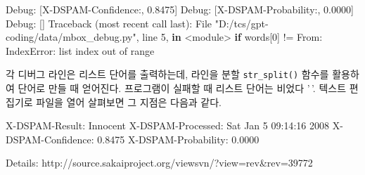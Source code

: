 \documentclass[
  letterpaper,
]{book}
\newenvironment{Shaded}{\begin{snugshade}}{\end{snugshade}}
\newcommand{\BuiltInTok}[1]{\textcolor[rgb]{0.00,0.23,0.31}{#1}}
\newcommand{\ControlFlowTok}[1]{\textcolor[rgb]{0.00,0.23,0.31}{\textbf{#1}}}
\newcommand{\DecValTok}[1]{\textcolor[rgb]{0.68,0.00,0.00}{#1}}
\newcommand{\ErrorTok}[1]{\textcolor[rgb]{0.68,0.00,0.00}{#1}}
\newcommand{\FloatTok}[1]{\textcolor[rgb]{0.68,0.00,0.00}{#1}}
\newcommand{\KeywordTok}[1]{\textcolor[rgb]{0.00,0.23,0.31}{\textbf{#1}}}
\newcommand{\NormalTok}[1]{\textcolor[rgb]{0.00,0.23,0.31}{#1}}
\newcommand{\OperatorTok}[1]{\textcolor[rgb]{0.37,0.37,0.37}{#1}}
\newcommand{\OtherTok}[1]{\textcolor[rgb]{0.00,0.23,0.31}{#1}}
\newcommand{\PreprocessorTok}[1]{\textcolor[rgb]{0.68,0.00,0.00}{#1}}
\newcommand{\SpecialCharTok}[1]{\textcolor[rgb]{0.37,0.37,0.37}{#1}}
\newcommand{\StringTok}[1]{\textcolor[rgb]{0.13,0.47,0.30}{#1}}
\begin{document}
\begin{Shaded}
\begin{Highlighting}[]
\NormalTok{Debug: [}\StringTok{\textquotesingle{}X{-}DSPAM{-}Confidence:\textquotesingle{}}\NormalTok{, }\StringTok{\textquotesingle{}0.8475\textquotesingle{}}\NormalTok{]}
\NormalTok{Debug: [}\StringTok{\textquotesingle{}X{-}DSPAM{-}Probability:\textquotesingle{}}\NormalTok{, }\StringTok{\textquotesingle{}0.0000\textquotesingle{}}\NormalTok{]}
\NormalTok{Debug: []}
\NormalTok{Traceback (most recent call last):}
\NormalTok{  File }\StringTok{"D:/tcs/gpt{-}coding/data/mbox\_debug.py"}\NormalTok{, line }\DecValTok{5}\NormalTok{, }\KeywordTok{in} \OperatorTok{\textless{}}\NormalTok{module}\OperatorTok{\textgreater{}}
    \ControlFlowTok{if}\NormalTok{ words[}\DecValTok{0}\NormalTok{] }\OperatorTok{!=} \StringTok{\textquotesingle{}From\textquotesingle{}}\NormalTok{:}
\PreprocessorTok{IndexError}\NormalTok{: }\BuiltInTok{list}\NormalTok{ index out of }\BuiltInTok{range}
\end{Highlighting}
\end{Shaded}

각 디버그 라인은 리스트 단어를 출력하는데, 라인을 분할
\texttt{str\_split()} 함수를 활용하여 단어로 만들 때 얻어진다.
프로그램이 실패할 때 리스트 단어는 비었다 '\,'. 텍스트 편집기로 파일을
열어 살펴보면 그 지점은 다음과 같다.

\begin{Shaded}
\begin{Highlighting}[]
\NormalTok{X}\SpecialCharTok{{-}}\NormalTok{DSPAM}\SpecialCharTok{{-}}\NormalTok{Result}\SpecialCharTok{:}\NormalTok{ Innocent}
\NormalTok{X}\SpecialCharTok{{-}}\NormalTok{DSPAM}\SpecialCharTok{{-}}\NormalTok{Processed}\SpecialCharTok{:}\NormalTok{ Sat Jan }\DecValTok{5} \DecValTok{09}\SpecialCharTok{:}\DecValTok{14}\SpecialCharTok{:}\DecValTok{16} \DecValTok{2008}
\NormalTok{X}\SpecialCharTok{{-}}\NormalTok{DSPAM}\SpecialCharTok{{-}}\NormalTok{Confidence}\SpecialCharTok{:} \FloatTok{0.8475}
\NormalTok{X}\SpecialCharTok{{-}}\NormalTok{DSPAM}\SpecialCharTok{{-}}\NormalTok{Probability}\SpecialCharTok{:} \FloatTok{0.0000}

\NormalTok{Details}\SpecialCharTok{:}\NormalTok{ http}\SpecialCharTok{:}\ErrorTok{//}\NormalTok{source.sakaiproject.org}\SpecialCharTok{/}\NormalTok{viewsvn}\SpecialCharTok{/}\NormalTok{?view}\OtherTok{=}\NormalTok{rev}\SpecialCharTok{\&}\NormalTok{rev}\OtherTok{=}\DecValTok{39772}
\end{Highlighting}
\end{Shaded}
\end{document}

